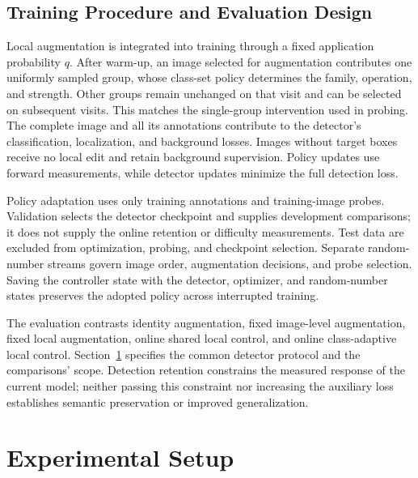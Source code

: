 \documentclass[conference]{IEEEtran}
\begin{document}
\subsection{Training Procedure and Evaluation Design}
\label{sec:method_evaluation}
Local augmentation is integrated into training through a fixed application probability $q$. After warm-up, an image selected for augmentation contributes one uniformly sampled group, whose class-set policy determines the family, operation, and strength. Other groups remain unchanged on that visit and can be selected on subsequent visits. This matches the single-group intervention used in probing. The complete image and all its annotations contribute to the detector's classification, localization, and background losses. Images without target boxes receive no local edit and retain background supervision. Policy updates use forward measurements, while detector updates minimize the full detection loss.

Policy adaptation uses only training annotations and training-image probes. Validation selects the detector checkpoint and supplies development comparisons; it does not supply the online retention or difficulty measurements. Test data are excluded from optimization, probing, and checkpoint selection. Separate random-number streams govern image order, augmentation decisions, and probe selection. Saving the controller state with the detector, optimizer, and random-number states preserves the adopted policy across interrupted training.

The evaluation contrasts identity augmentation, fixed image-level augmentation, fixed local augmentation, online shared local control, and online class-adaptive local control. Section~\ref{sec:experimental_setup} specifies the common detector protocol and the comparisons' scope. Detection retention constrains the measured response of the current model; neither passing this constraint nor increasing the auxiliary loss establishes semantic preservation or improved generalization.

\section{Experimental Setup}
\label{sec:experimental_setup}
\end{document}
